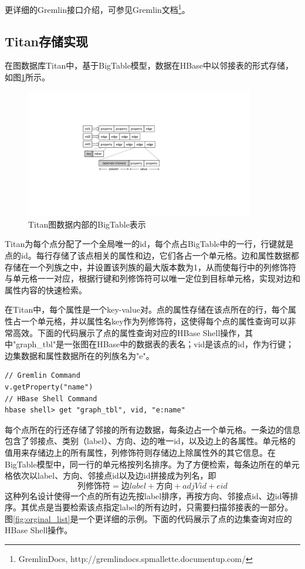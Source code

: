 更详细的Gremlin接口介绍，可参见Gremlin文档\footnote{GremlinDocs, http://gremlindocs.spmallette.documentup.com/}。

\subsection{Titan存储实现}
在图数据库Titan中，基于BigTable模型，数据在HBase中以邻接表的形式存储，如图\ref{fig:adj_list}所示。

\begin{figure}[htbp]
\centering
\includegraphics[width=100mm]{fig/adj_list.pdf}
\caption{Titan图数据内部的BigTable表示}
\label{fig:adj_list}
\end{figure}

Titan为每个点分配了一个全局唯一的id，每个点占BigTable中的一行，行键就是点的id。每行存储了该点相关的属性和边，它们各占一个单元格。边和属性数据都存储在一个列族之中，并设置该列族的最大版本数为1，从而使每行中的列修饰符与单元格一一对应，根据行键和列修饰符可以唯一定位到目标单元格，实现对边和属性内容的快速检索。

在Titan中，每个属性是一个key-value对。点的属性存储在该点所在的行，每个属性占一个单元格，并以属性名key作为列修饰符，这使得每个点的属性查询可以非常高效。下面的代码展示了点的属性查询对应的HBase Shell操作，其中"graph\_tbl"是一张图在HBase中的数据表的表名；vid是该点的id，作为行键；边集数据和属性数据所在的列族名为"e"。
\begin{lstlisting}
// Gremlin Command
v.getProperty("name")
// HBase Shell Command
hbase shell> get "graph_tbl", vid, "e:name"
\end{lstlisting}

每个点所在的行还存储了邻接的所有边数据，每条边占一个单元格。一条边的信息包含了邻接点、类别（label）、方向、边的唯一id，以及边上的各属性。单元格的值用来存储边上的所有属性，列修饰符则存储边上除属性外的其它信息。在BigTable模型中，同一行的单元格按列名排序。为了方便检索，每条边所在的单元格依次以label、方向、邻接点id以及边id拼接成为列名，即
\begin{equation}
  \mbox{列修饰符} = \mbox{边}label + \mbox{方向} + adjVid + eid \label{eq:cq_design}
\end{equation}
这种列名设计使得一个点的所有边先按label排序，再按方向、邻接点id、边id等排序。其优点是当要检索该点指定label的所有边时，只需要扫描邻接表的一部分。图\ref{fig:orginal_list}是一个更详细的示例。下面的代码展示了点的边集查询对应的HBase Shell操作。

